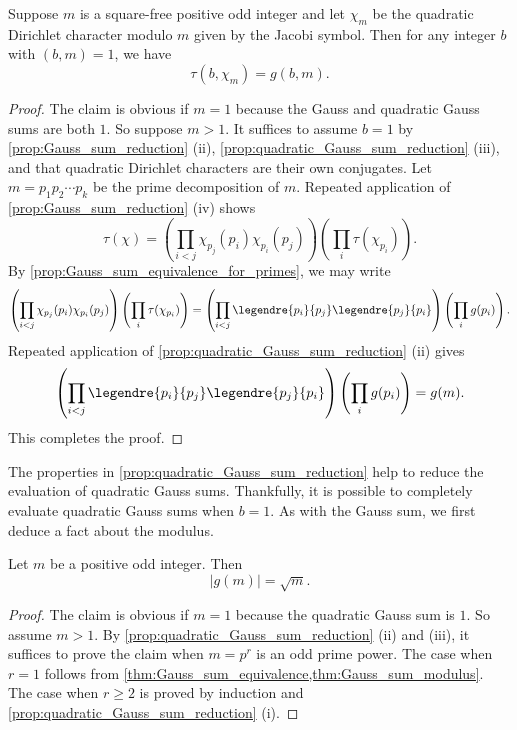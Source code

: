 \documentclass[12pt]{article}
\begin{document}
      \begin{theorem}\label{thm:Gauss_sum_equivalence}
        Suppose \(m\) is a square-free positive odd integer and let \(\chi_{m}\) be the quadratic Dirichlet character modulo \(m\) given by the Jacobi symbol. Then for any integer \(b\) with \((b,m) = 1\), we have
        \[
          \tau(b,\chi_{m}) = g(b,m).
        \]
      \end{theorem}
      \begin{proof}
        The claim is obvious if \(m = 1\) because the Gauss and quadratic Gauss sums are both \(1\). So suppose \(m > 1\). It suffices to assume \(b = 1\) by \cref{prop:Gauss_sum_reduction} (ii), \cref{prop:quadratic_Gauss_sum_reduction} (iii), and that quadratic Dirichlet characters are their own conjugates. Let \(m = p_{1}p_{2} \cdots p_{k}\) be the prime decomposition of \(m\). Repeated application of \cref{prop:Gauss_sum_reduction} (iv) shows
        \[
          \tau(\chi) = \left(\prod_{i < j}\chi_{p_{j}}(p_{i})\chi_{p_{i}}(p_{j})\right)\left(\prod_{i}\tau(\chi_{p_{i}})\right).
        \]
        By \cref{prop:Gauss_sum_equivalence_for_primes}, we may write
        \[
          \left(\prod_{i < j}\chi_{p_{j}}(p_{i})\chi_{p_{i}}(p_{j})\right)\left(\prod_{i}\tau(\chi_{p_{i}})\right) = \left(\prod_{i < j}\legendre{p_{i}}{p_{j}}\legendre{p_{j}}{p_{i}}\right)\left(\prod_{i}g(p_{i})\right).
        \]
        Repeated application of \cref{prop:quadratic_Gauss_sum_reduction} (ii) gives
        \[
          \left(\prod_{i < j}\legendre{p_{i}}{p_{j}}\legendre{p_{j}}{p_{i}}\right)\left(\prod_{i}g(p_{i})\right) = g(m).
        \]
        This completes the proof.
      \end{proof}

      The properties in \cref{prop:quadratic_Gauss_sum_reduction} help to reduce the evaluation of quadratic Gauss sums. Thankfully, it is possible to completely evaluate quadratic Gauss sums when \(b = 1\). As with the Gauss sum, we first deduce a fact about the modulus.

      \begin{theorem}\label{thm:quadratic_Gauss_sum_modulus}
        Let \(m\) be a positive odd integer. Then
        \[
          |g(m)| = \sqrt{m}.
        \]
      \end{theorem}
      \begin{proof}
        The claim is obvious if \(m = 1\) because the quadratic Gauss sum is \(1\). So assume \(m > 1\). By \cref{prop:quadratic_Gauss_sum_reduction} (ii) and (iii), it suffices to prove the claim when \(m = p^{r}\) is an odd prime power. The case when \(r = 1\) follows from \cref{thm:Gauss_sum_equivalence,thm:Gauss_sum_modulus}. The case when \(r \ge 2\) is proved by induction and \cref{prop:quadratic_Gauss_sum_reduction} (i).
      \end{proof}
\end{document}
